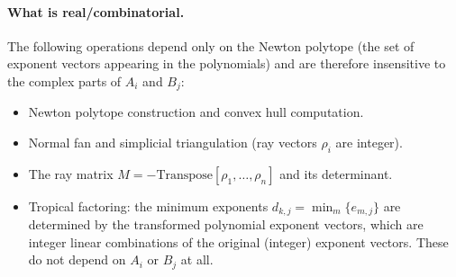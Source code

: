 \documentclass[11pt,a4paper]{article}
\begin{document}
\paragraph{What is real/combinatorial.}
The following operations depend only on the Newton polytope (the set of
exponent vectors appearing in the polynomials) and are therefore insensitive
to the complex parts of $A_i$ and $B_j$:
\begin{itemize}
  \item Newton polytope construction and convex hull computation.
  \item Normal fan and simplicial triangulation (ray vectors $\rho_i$ are integer).
  \item The ray matrix $M = -\mathrm{Transpose}[\rho_1, \ldots, \rho_n]$ and its determinant.
  \item Tropical factoring: the minimum exponents $d_{k,j} = \min_m\{e_{m,j}\}$ are determined by the transformed polynomial exponent vectors, which are integer linear combinations of the original (integer) exponent vectors. These do not depend on $A_i$ or $B_j$ at all.
\end{itemize}
\end{document}
